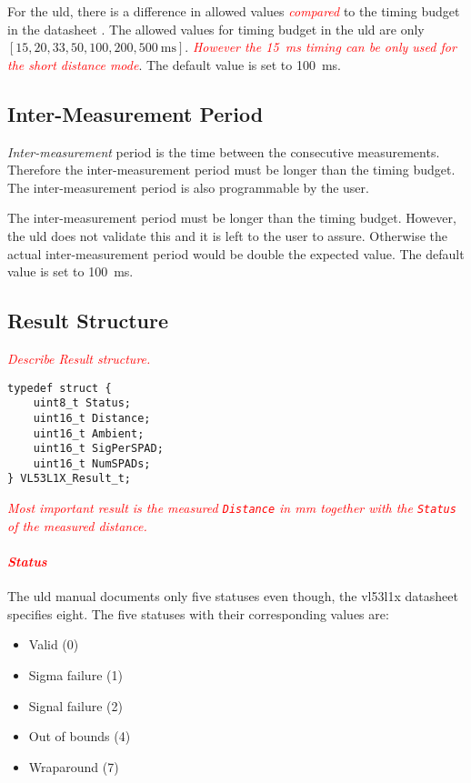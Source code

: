\documentclass[
  digital,     %
  oneside,     %
  nosansbold,  %
  nocolorbold, %
  lof,         %
  lot,         %
]{fithesis4}
\newcommand{\TODO}[1]{\textcolor{red}{\textit{#1}}}
\begin{document}
For the \acrshort{uld}, there is a difference in allowed values \TODO{compared} to the timing budget in the datasheet \cite{vl53l1x}. The allowed values for timing budget in the \acrshort{uld} are only $[15, 20,
33, 50, 100, 200, \qty{500}{\milli\second}]$. \TODO{However the \qty{15}{\milli\second} timing can be only used for the short distance mode}. The default value is set to \qty{100}{\milli\second}.

\subsection{ Inter-Measurement Period }
\emph{Inter-measurement} period is the time between the consecutive measurements. Therefore the inter-measurement period must be longer than the timing budget. The inter-measurement period is also programmable by the user.

The inter-measurement period must be longer than the timing budget. However, the \acrshort{uld} does not validate this and it is left to the user to assure. Otherwise the actual inter-measurement period would be double the expected value. The default value is set to \qty{100}{\milli\second}.

\subsection{ Result Structure }
\TODO{Describe Result structure.}

\begin{lstlisting}
typedef struct {
    uint8_t Status;
    uint16_t Distance;
    uint16_t Ambient;
    uint16_t SigPerSPAD;
    uint16_t NumSPADs;
} VL53L1X_Result_t;
\end{lstlisting}

\TODO{
Most important result is the measured \lstinline|Distance| in \unit{\milli\metre} together with the \lstinline|Status| of the measured distance.
}

\paragraph{\TODO{Status}}

The \acrshort{uld} manual \cite{um2510} documents only five statuses even though, the \gls{vl53l1x} datasheet \cite{vl53l1x} specifies eight. The five statuses with their corresponding values are:
\begin{itemize}
    \item Valid (0)
    \item Sigma failure (1)
    \item Signal failure (2)
    \item Out of bounds (4)
    \item Wraparound (7)
\end{itemize}
\end{document}
